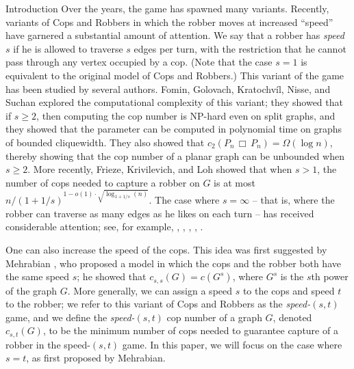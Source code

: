 \documentclass[12pt]{amsart}
\theoremstyle{definition}
\def\cart{\, \Box \,}
\begin{document}
\begin{section}{Introduction}
Over the years, the game has spawned many variants.  Recently, variants of Cops and Robbers in which the robber moves at increased ``speed'' have garnered a substantial amount of attention.  We say that a robber has \textit{speed $s$} if he is allowed to traverse $s$ edges per turn, with the restriction that he cannot pass through any vertex occupied by a cop.  (Note that the case $s=1$ is equivalent to the original model of Cops and Robbers.)  This variant of the game has been studied by several authors.  Fomin, Golovach, Kratochv\'{i}l, Nisse, and Suchan \cite{FGKNS10} explored the computational complexity of this variant; they showed that if $s \ge 2$, then computing the cop number is NP-hard even on split graphs, and they showed that the parameter can be computed in polynomial time on graphs of bounded cliquewidth.  They also showed that $c_2(P_n \cart P_n) = \Omega(\log n)$, thereby showing that the cop number of a planar graph can be unbounded when $s \ge 2$.  More recently, Frieze, Krivilevich, and Loh \cite{FKL12} showed that when $s>1$, the number of cops needed to capture a robber on $G$ is at most $\displaystyle n/\left(1+1/s\right)^{1-o(1)\cdot \sqrt{\log_{1+1/s}(n)}}$.  The case where $s = \infty$ -- that is, where the robber can traverse as many edges as he likes on each turn -- has received considerable attention; see, for example, \cite{AM15}, \cite{KT22}, \cite{Meh12}, \cite{Meh15}, \cite{MehThesis}.

One can also increase the speed of the cops.  This idea was first suggested by Mehrabian \cite{MehThesis}, who proposed a model in which the cops and the robber both have the same speed $s$; he showed that $c_{s,s}(G)=c(G^s)$, where $G^s$ is the $s$th power of the graph $G$.  More generally, we can assign a speed $s$ to the cops and speed $t$ to the robber; we refer to this variant of Cops and Robbers as the \textit{speed-$(s,t)$} game, and we define the \textit{speed-$(s,t)$} cop number of a graph $G$, denoted $c_{s,t}(G)$, to be the minimum number of cops needed to guarantee capture of a robber in the speed-$(s,t)$ game.  In this paper, we will focus on the case where $s=t$, as first proposed by Mehrabian.%


\end{section}
\end{document}
